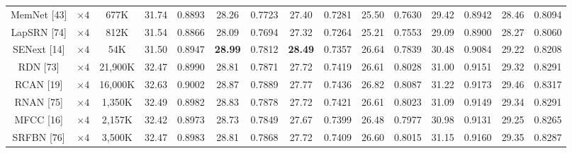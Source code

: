 \documentclass{ieeeaccess}
\begin{document}
\begin{table}
\begin{tabular}{|c|c|c|cc|cc|cc|cc|cc|cc|}
MemNet [43] & $\times4$ &677K& \multicolumn{1}{c|}{31.74} &0.8893& \multicolumn{1}{c|}{28.26} &0.7723 &\multicolumn{1}{c|}{27.40} &0.7281& \multicolumn{1}{c|}{25.50} &0.7630& \multicolumn{1}{c|}{29.42} & 0.8942
&\multicolumn{1}{c|}{28.46} &0.8094\\

LapSRN [74] & $\times4$ &812K& \multicolumn{1}{c|}{31.54} &0.8866 & \multicolumn{1}{c|}{28.09} &0.7694  &\multicolumn{1}{c|}{27.32} &0.7264  & \multicolumn{1}{c|}{25.21 } &0.7553   & \multicolumn{1}{c|}{29.09 } &0.8900
&\multicolumn{1}{c|}{28.27 } &0.8060 \\

SENext [14] & $\times4$  &54K& \multicolumn{1}{c|}{31.50} &0.8947  & \multicolumn{1}{c|}{\color{red}\textbf{28.99}} &{0.7812}  & \multicolumn{1}{c|}{\color{red}\textbf{28.49}} &{0.7357} & \multicolumn{1}{c|}{26.64 } &{0.7839}  & \multicolumn{1}{c|}{30.48} &{0.9084}
&\multicolumn{1}{c|}{29.22} &{0.8208}    \\

RDN [73]& $\times4$ &21,900K& \multicolumn{1}{c|}{32.47} & 0.8990& \multicolumn{1}{c|}{28.81} &0.7871  &\multicolumn{1}{c|}{27.72} &0.7419 & \multicolumn{1}{c|}{26.61} &0.8028 & \multicolumn{1}{c|}{31.00 } &0.9151
&\multicolumn{1}{c|}{29.32} &0.8291 \\

RCAN [19]& $\times4$ &16,000K & \multicolumn{1}{c|}{32.63} &0.9002 & \multicolumn{1}{c|}{28.87} & 0.7889&\multicolumn{1}{c|}{27.77} &0.7436 & \multicolumn{1}{c|}{26.82} &0.8087 & \multicolumn{1}{c|}{31.22 } & 0.9173
&\multicolumn{1}{c|}{29.46} &0.8317 \\

RNAN [75]& $\times4$ &1,350K& \multicolumn{1}{c|}{32.49} &0.8982  & \multicolumn{1}{c|}{28.83 } &0.7878 &\multicolumn{1}{c|}{27.72} &0.7421 & \multicolumn{1}{c|}{26.61 } &0.8023 & \multicolumn{1}{c|}{31.09 } & 0.9149
&\multicolumn{1}{c|}{29.34 } &0.8291 \\

MFCC [16]& $\times 4$&2,157K& \multicolumn{1}{c|}{32.42} & 0.8973 & \multicolumn{1}{c|}{28.73} &0.7849 &\multicolumn{1}{c|}{27.67} & 0.7399 & \multicolumn{1}{c|}{26.48} &0.7977 & \multicolumn{1}{c|}{30.98} & 0.9131
&\multicolumn{1}{c|}{29.25} & 0.8265\\

SRFBN [76]& $\times4$ &3,500K& \multicolumn{1}{c|}{32.47} &0.8983 & \multicolumn{1}{c|}{28.81} &0.7868 &\multicolumn{1}{c|}{27.72} &0.7409 & \multicolumn{1}{c|}{26.60} &0.8015 & \multicolumn{1}{c|}{31.15} & 0.9160
&\multicolumn{1}{c|}{29.35} &0.8287  \\


\end{tabular}
\end{table}
\end{document}
